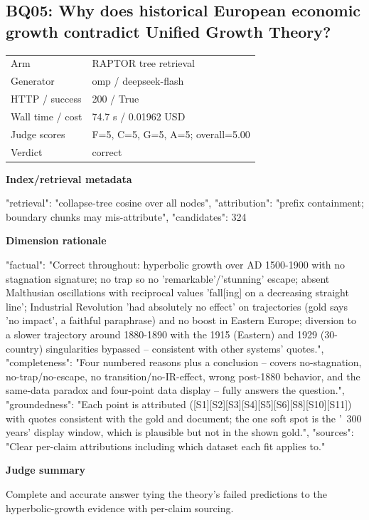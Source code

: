 \documentclass[10pt]{article}
\begin{document}
\subsection{BQ05: Why does historical European economic growth contradict Unified Growth Theory?}
\begin{tabular}{@{}ll@{}}
Arm & RAPTOR tree retrieval\\
Generator & omp / deepseek-flash\\
HTTP / success & 200 / True\\
Wall time / cost & 74.7 s / 0.01962 USD\\
Judge scores & F=5, C=5, G=5, A=5; overall=5.00\\
Verdict & correct\\
\end{tabular}

\textbf{Index/retrieval metadata}
\begin{EvidenceText}
{
  "retrieval": "collapse-tree cosine over all nodes",
  "attribution": "prefix containment; boundary chunks may mis-attribute",
  "candidates": 324
}
\end{EvidenceText}

\textbf{Dimension rationale}
\begin{EvidenceText}
{
  "factual": "Correct throughout: hyperbolic growth over AD 1500-1900 with no stagnation signature; no trap so no 'remarkable'/'stunning' escape; absent Malthusian oscillations with reciprocal values 'fall[ing] on a decreasing straight line'; Industrial Revolution 'had absolutely no effect' on trajectories (gold says 'no impact', a faithful paraphrase) and no boost in Eastern Europe; diversion to a slower trajectory around 1880-1890 with the 1915 (Eastern) and 1929 (30-country) singularities bypassed -- consistent with other systems' quotes.",
  "completeness": "Four numbered reasons plus a conclusion -- covers no-stagnation, no-trap/no-escape, no transition/no-IR-effect, wrong post-1880 behavior, and the same-data paradox and four-point data display -- fully answers the question.",
  "groundedness": "Each point is attributed ([S1][S2][S3][S4][S5][S6][S8][S10][S11]) with quotes consistent with the gold and document; the one soft spot is the '~300 years' display window, which is plausible but not in the shown gold.",
  "sources": "Clear per-claim attributions including which dataset each fit applies to."
}
\end{EvidenceText}

\textbf{Judge summary}
\begin{EvidenceText}
Complete and accurate answer tying the theory's failed predictions to the hyperbolic-growth evidence with per-claim sourcing.
\end{EvidenceText}
\end{document}
